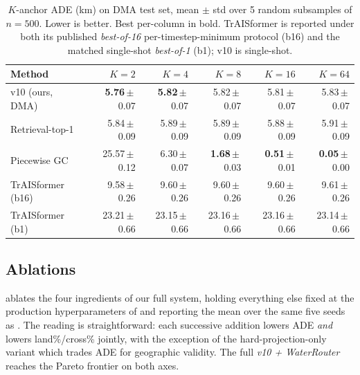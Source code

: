 \documentclass[11pt]{article}
\begin{document}
\begin{table}[t]
  \centering
  \small
  \caption{$K$-anchor ADE (km) on DMA test set, mean $\pm$ std over 5
  random subsamples of $n=500$. Lower is better. Best per-column in bold.
  TrAISformer is reported under both its published \emph{best-of-16}
  per-timestep-minimum protocol (b16) and the matched single-shot
  \emph{best-of-1} (b1); v10 is single-shot.}
  \label{tab:dma_k_anchor}
  \begin{tabular}{lrrrrr}
    \toprule
    Method            & $K{=}2$ & $K{=}4$ & $K{=}8$ & $K{=}16$ & $K{=}64$ \\
    \midrule
    v10 (ours, DMA)   & \textbf{5.76}\,$\pm$\,0.07 & \textbf{5.82}\,$\pm$\,0.07 & 5.82\,$\pm$\,0.07 & 5.81\,$\pm$\,0.07 & 5.83\,$\pm$\,0.07 \\
    Retrieval-top-1   & 5.84\,$\pm$\,0.09          & 5.89\,$\pm$\,0.09          & 5.89\,$\pm$\,0.09 & 5.88\,$\pm$\,0.09 & 5.91\,$\pm$\,0.09 \\
    Piecewise GC      & 25.57\,$\pm$\,0.12         & 6.30\,$\pm$\,0.07          & \textbf{1.68}\,$\pm$\,0.03 & \textbf{0.51}\,$\pm$\,0.01 & \textbf{0.05}\,$\pm$\,0.00 \\
    TrAISformer (b16) & 9.58\,$\pm$\,0.26          & 9.60\,$\pm$\,0.26          & 9.60\,$\pm$\,0.26 & 9.60\,$\pm$\,0.26 & 9.61\,$\pm$\,0.26 \\
    TrAISformer (b1)  & 23.21\,$\pm$\,0.66         & 23.15\,$\pm$\,0.66         & 23.16\,$\pm$\,0.66 & 23.16\,$\pm$\,0.66 & 23.14\,$\pm$\,0.66 \\
    \bottomrule
  \end{tabular}
\end{table}

\subsection{Ablations}
\label{sec:ablations}

 ablates the four ingredients of our full system,
holding everything else fixed at the production hyperparameters of
 and reporting the mean over the same five seeds
as . The reading is straightforward: each successive
addition lowers ADE \emph{and} lowers land\%/cross\% jointly, with the
exception of the hard-projection-only variant which trades ADE for
geographic validity. The full \textit{v10 + WaterRouter} reaches the
Pareto frontier on both axes.


\end{document}
